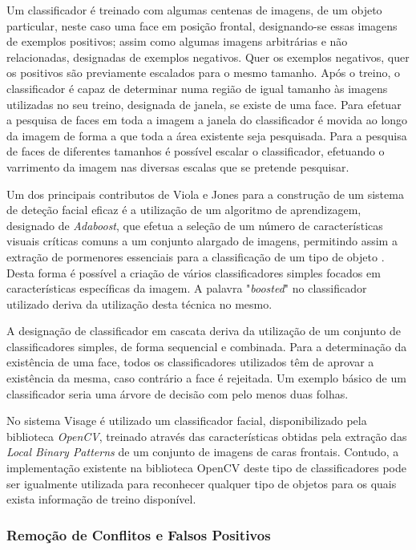 Um classificador é treinado com algumas centenas de imagens, de um objeto particular, neste caso uma face em posição frontal, designando-se essas imagens de exemplos positivos; assim como algumas imagens arbitrárias e não relacionadas, designadas de exemplos negativos. Quer os exemplos negativos, quer os positivos são previamente escalados para o mesmo tamanho. Após o treino, o classificador é capaz de determinar numa região de igual tamanho às imagens utilizadas no seu treino, designada de janela, se existe de uma face. Para efetuar a pesquisa de faces em toda a imagem a janela do classificador é movida ao longo da imagem de forma a que toda a área existente seja pesquisada. Para a pesquisa de faces de diferentes tamanhos é possível escalar o classificador, efetuando o varrimento da imagem nas diversas escalas que se pretende pesquisar.

Um dos principais contributos de Viola e Jones para a construção de um sistema de deteção facial eficaz é a utilização de um algoritmo de aprendizagem, designado de \textit{Adaboost}, que efetua a seleção de um número de características visuais críticas comuns a um conjunto alargado de imagens, permitindo assim a extração de pormenores essenciais para a classificação de um tipo de objeto \cite{Viola2001}. Desta forma é possível a criação de vários classificadores simples focados em características específicas da imagem. A palavra "\textit{boosted}" no classificador utilizado deriva da utilização desta técnica no mesmo.
 
A designação de classificador em cascata deriva da utilização de um conjunto de classificadores simples, de forma sequencial e combinada. Para a determinação da existência de uma face, todos os classificadores utilizados  têm de aprovar a existência da mesma, caso contrário a face é rejeitada. Um exemplo básico de um classificador seria uma árvore de decisão com pelo menos duas folhas.

No sistema Visage é utilizado um classificador facial, disponibilizado pela biblioteca \textit{OpenCV}, treinado através das características obtidas pela extração das \textit{Local Binary Patterns} \cite{Ahonen2006} de um conjunto de imagens de caras frontais. Contudo, a implementação existente na biblioteca OpenCV deste tipo de classificadores pode ser igualmente utilizada para reconhecer qualquer tipo de objetos para os quais exista informação de treino disponível.

\subsubsection*{Remoção de Conflitos e Falsos Positivos}

